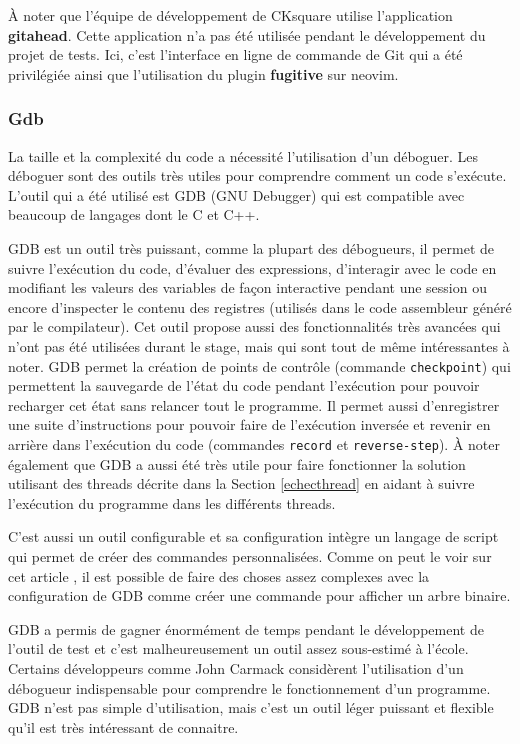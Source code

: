 \documentclass[a4paper]{article}
\begin{document}
À noter que l'équipe de développement de CKsquare utilise l'application
\textbf{gitahead}. Cette application n'a pas été utilisée pendant le
développement du projet de tests. Ici, c'est l'interface en ligne de commande de Git
qui a été privilégiée ainsi que l'utilisation du plugin \textbf{fugitive} sur
neovim.
\subsubsection{Gdb}%

La taille et la complexité du code a nécessité l'utilisation d'un déboguer. Les
déboguer sont des outils très utiles pour comprendre comment un code
s'exécute. L'outil qui a été utilisé est GDB (GNU Debugger) qui est compatible
avec beaucoup de langages dont le C et C++.

GDB est un outil très puissant, comme la plupart des débogueurs, il permet de
suivre l'exécution du code, d'évaluer des expressions, d'interagir avec le code
en modifiant les valeurs des variables de façon interactive pendant une session
ou encore d'inspecter le contenu des registres (utilisés dans le code assembleur
généré par le compilateur). Cet outil propose aussi des fonctionnalités très
avancées qui n'ont pas été utilisées durant le stage, mais qui sont tout de même
intéressantes à noter. GDB permet la création de points de contrôle (commande
\verb|checkpoint|) qui permettent la sauvegarde de l'état du code pendant
l'exécution pour pouvoir recharger cet état sans relancer tout le programme. Il
permet aussi d'enregistrer une suite d'instructions pour pouvoir faire de
l'exécution inversée et revenir en arrière dans l'exécution du code (commandes
\verb|record| et \verb|reverse-step|). À noter également que GDB a aussi été
très utile pour faire fonctionner la solution utilisant des threads décrite dans
la Section \ref{echecthread} en aidant à suivre l'exécution du programme dans
les différents threads.

C'est aussi un outil configurable et sa configuration intègre un langage de
script qui permet de créer des commandes personnalisées. Comme on peut le voir
sur cet article \cite{gdbinit}, il est possible de faire des choses assez
complexes avec la configuration de GDB comme créer une commande pour afficher un
arbre binaire.

GDB a permis de gagner énormément de temps pendant le développement de l'outil
de test et c'est malheureusement un outil assez sous-estimé à l'école. Certains
développeurs comme John Carmack considèrent l'utilisation d'un débogueur
indispensable pour comprendre le fonctionnement d'un programme. GDB n'est pas
simple d'utilisation, mais c'est un outil léger puissant et flexible qu'il est
très intéressant de connaitre.
\end{document}
